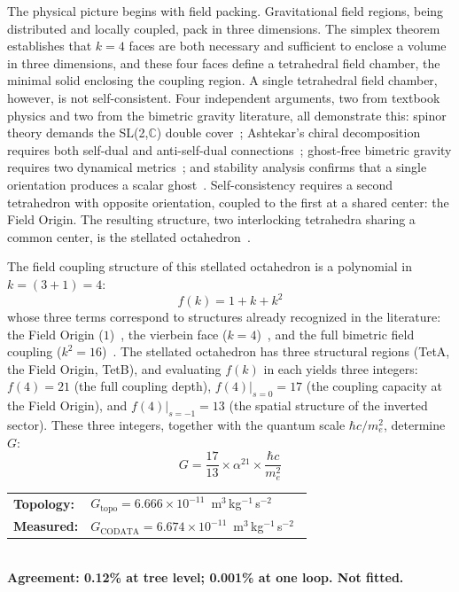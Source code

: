 \documentclass[aps,prd,preprint,superscriptaddress,showpacs,preprintnumbers,amsmath,amssymb,nofootinbib]{revtex4-2}
\begin{document}
The physical picture begins with field packing. Gravitational field regions, being distributed and locally coupled, pack in three dimensions. The simplex theorem establishes that $k = 4$ faces are both necessary and sufficient to enclose a volume in three dimensions, and these four faces define a tetrahedral field chamber, the minimal solid enclosing the coupling region. A single tetrahedral field chamber, however, is not self-consistent. Four independent arguments, two from textbook physics and two from the bimetric gravity literature, all demonstrate this: spinor theory demands the SL(2,$\mathbb{C}$) double cover~\cite{weinberg1995,geroch1968}; Ashtekar's chiral decomposition requires both self-dual and anti-self-dual connections~\cite{ashtekar1986}; ghost-free bimetric gravity requires two dynamical metrics~\cite{hassan2012}; and stability analysis confirms that a single orientation produces a scalar ghost~\cite{alexander2014}. Self-consistency requires a second tetrahedron with opposite orientation, coupled to the first at a shared center: the Field Origin. The resulting structure, two interlocking tetrahedra sharing a common center, is the stellated octahedron~\cite{coxeter1973}.

The field coupling structure of this stellated octahedron is a polynomial in $k = (3{+}1) = 4$:
\begin{equation}
f(k) = 1 + k + k^2
\end{equation}
whose three terms correspond to structures already recognized in the literature: the Field Origin ($1$)~\cite{hinterbichler2012}, the vierbein face ($k = 4$)~\cite{mtw1973}, and the full bimetric field coupling ($k^2 = 16$)~\cite{hassan2012}. The stellated octahedron has three structural regions (TetA, the Field Origin, TetB), and evaluating $f(k)$ in each yields three integers: $f(4) = 21$ (the full coupling depth), $f(4)|_{s=0} = 17$ (the coupling capacity at the Field Origin), and $f(4)|_{s=-1} = 13$ (the spatial structure of the inverted sector). These three integers, together with the quantum scale $\hbar c / m_e^2$, determine $G$:
\begin{equation}
G = \frac{17}{13} \times \alpha^{21} \times \frac{\hbar c}{m_e^2}
\label{eq:G}
\end{equation}
\begin{center}
\renewcommand{\arraystretch}{1.3}
\begin{tabular}{@{}ll@{}}
\textbf{Topology:} & $G_{\text{topo}} = 6.666 \times 10^{-11}$~m$^3$\,kg$^{-1}$\,s$^{-2}$ \\
\textbf{Measured:} & $G_{\text{CODATA}} = 6.674 \times 10^{-11}$~m$^3$\,kg$^{-1}$\,s$^{-2}$~\cite{codata2022} \\
\end{tabular}\\[4pt]
\textbf{Agreement: 0.12\% at tree level; 0.001\% at one loop. Not fitted.}
\end{center}
\end{document}
